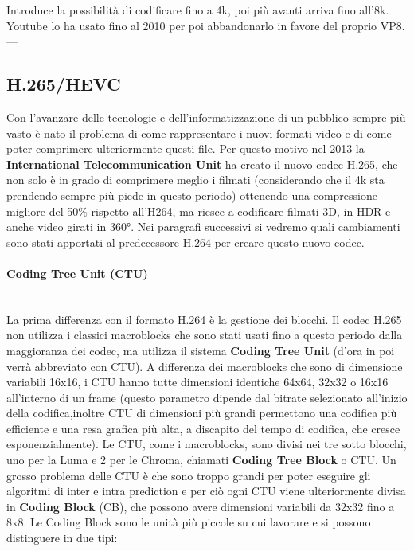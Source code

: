\documentclass[a4paper,12pt, oneside]{article}
\begin{document}
Introduce la possibilità di codificare fino a 4k, poi più avanti arriva fino all'8k.
Youtube lo ha usato fino al 2010 per poi abbandonarlo in favore del proprio VP8.
---

\subsection{H.265/HEVC}
Con l'avanzare delle tecnologie e dell'informatizzazione di un pubblico sempre più vasto
è nato il problema di come rappresentare i nuovi formati video e di come poter comprimere ulteriormente
questi file. Per questo motivo nel 2013 la \textbf{International Telecommunication Unit} ha creato il
nuovo codec H.265, che non solo è in grado di comprimere meglio i filmati (considerando che il 4k sta
prendendo sempre più piede in questo periodo) ottenendo una compressione migliore del 50\% rispetto all'H264, ma
riesce a codificare filmati 3D, in HDR e anche video girati in 360°. Nei paragrafi successivi si vedremo quali
cambiamenti sono stati apportati al predecessore H.264 per creare questo nuovo codec.

\paragraph{Coding Tree Unit (CTU)}\hphantom{A}\\
La prima differenza con il formato H.264 è la gestione dei blocchi. Il codec H.265 non utilizza
i classici macroblocks che sono stati usati fino a questo periodo dalla maggioranza dei codec, ma
utilizza il sistema \textbf{Coding Tree Unit} (d'ora in poi verrà abbreviato con CTU). A differenza
dei macroblocks che sono di dimensione variabili 16x16, i CTU hanno tutte dimensioni identiche
64x64, 32x32 o 16x16 all'interno di un frame (questo parametro dipende dal bitrate selezionato all'inizio
della codifica,inoltre CTU di dimensioni più grandi permettono una codifica più efficiente e una resa
grafica più alta, a discapito del tempo di codifica, che cresce esponenzialmente). Le CTU, come i
macroblocks, sono divisi nei tre sotto blocchi, uno per la Luma e 2 per le Chroma, chiamati \textbf{Coding Tree Block} o CTU.
Un grosso problema delle CTU è che sono troppo grandi per poter eseguire gli algoritmi di inter e intra
prediction e per ciò ogni CTU viene ulteriormente divisa in \textbf{Coding Block} (CB), che possono avere
dimensioni variabili da 32x32 fino a 8x8.
Le Coding Block sono le unità più piccole su cui lavorare e si possono distinguere in due tipi:
\end{document}
